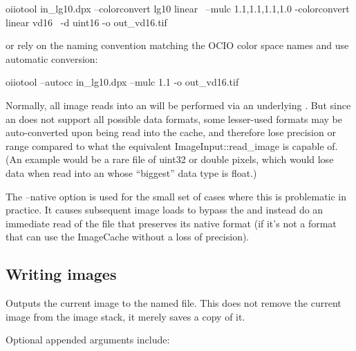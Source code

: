 \begin{code}
  oiiotool in_lg10.dpx --colorconvert lg10 linear \
                       --mulc 1.1,1.1,1.1,1.0 -colorconvert linear vd16 \
                       -d uint16 -o out_vd16.tif
\end{code}

\noindent or rely on the naming convention matching the OCIO color space
names and use automatic conversion:

\begin{code}
  oiiotool --autocc in_lg10.dpx --mulc 1.1 -o out_vd16.tif
\end{code}

\apiend

Normally, all image reads into an \ImageBuf will be performed via an
underlying \ImageCache. But since an \ImageCache does not support all
possible data formats, some lesser-used formats may be auto-converted upon
being read into the cache, and therefore lose precision or range compared to
what the equivalent {\cf ImageInput::read_image} is capable of. (An example
would be a rare file of {\cf uint32} or {\cf double} pixels, which would
lose data when read into an \ImageCache whose ``biggest'' data type is
{\cf float}.)

The {\cf --native} option is used for the small set of cases where this is
problematic in practice. It causes subsequent image loads to bypass the
\ImageCache and instead do an immediate read of the file that preserves its
native format (if it's not a format that can use the ImageCache without a
loss of precision).
\apiend

\newpage
\subsection*{Writing images}

\label{sec:oiiotool:o}
Outputs the current image to the named file.  This does not remove the
current image from the image stack, it merely saves a copy of it.

\noindent Optional appended arguments include:

